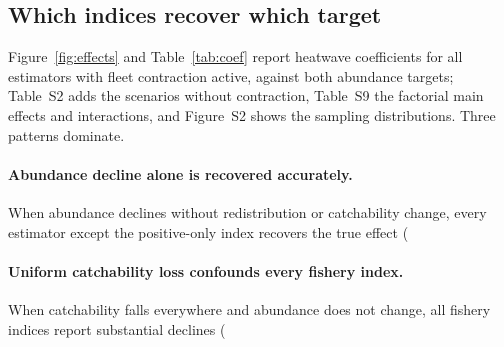 \documentclass[11pt,a4paper]{article}
\begin{document}
\subsection{Which indices recover which target}
\label{sec:res-factorial}

Figure~\ref{fig:effects} and Table~\ref{tab:coef} report heatwave coefficients for all estimators with fleet contraction active, against both abundance targets; Table~S2 adds the scenarios without contraction, Table~S9 the factorial main effects and interactions, and Figure~S2 shows the sampling distributions. Three patterns dominate.

\paragraph{Abundance decline alone is recovered accurately.} When abundance declines without redistribution or catchability change, every estimator except the positive-only index recovers the true effect (%

\paragraph{Uniform catchability loss confounds every fishery index.} When catchability falls everywhere and abundance does not change, all fishery indices report substantial declines (%
\end{document}
